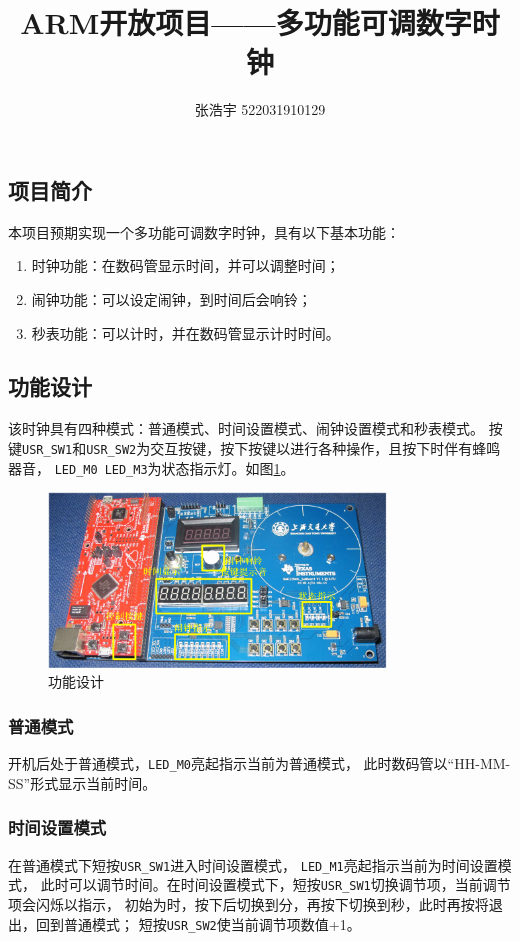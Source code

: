 \documentclass[12pt, a4paper, oneside]{ctexart}
\title{\textbf{ARM开放项目——多功能可调数字时钟}}
\author{张浩宇 522031910129}
\date{}
\begin{document}
    \maketitle
    \subsection{项目简介}
    本项目预期实现一个多功能可调数字时钟，具有以下基本功能：
    \begin{enumerate}
        \item 时钟功能：在数码管显示时间，并可以调整时间；
        \item 闹钟功能：可以设定闹钟，到时间后会响铃；
        \item 秒表功能：可以计时，并在数码管显示计时时间。
    \end{enumerate}
    \subsection{功能设计}
    该时钟具有四种模式：普通模式、时间设置模式、闹钟设置模式和秒表模式。
    按键\verb|USR_SW1|和\verb|USR_SW2|为交互按键，按下按键以进行各种操作，且按下时伴有蜂鸣器音，
    \verb|LED_M0|~\verb|LED_M3|为状态指示灯。如图\ref{fig:s800}。
    \begin{figure}[h]
        \centering
        \includegraphics[width=0.8\textwidth]{./img/s800.png}
        \caption{功能设计}
        \label{fig:s800}
    \end{figure}
    \subsubsection{普通模式}
    开机后处于普通模式，\verb|LED_M0|亮起指示当前为普通模式，
    此时数码管以“HH-MM-SS”形式显示当前时间。
    \subsubsection{时间设置模式}
    在普通模式下短按\verb|USR_SW1|进入时间设置模式，
    \verb|LED_M1|亮起指示当前为时间设置模式，
    此时可以调节时间。在时间设置模式下，短按\verb|USR_SW1|切换调节项，当前调节项会闪烁以指示，
    初始为时，按下后切换到分，再按下切换到秒，此时再按将退出，回到普通模式；
    短按\verb|USR_SW2|使当前调节项数值+1。
\end{document}
